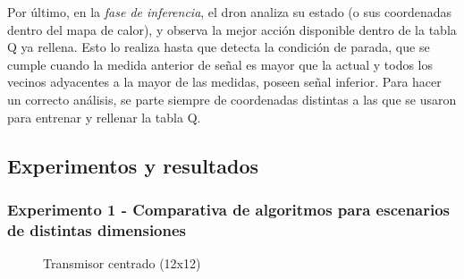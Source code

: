 Por último, en la \emph{fase de inferencia}, el dron analiza su estado (o sus coordenadas dentro del mapa de calor), y observa la mejor acción disponible dentro de la tabla Q ya rellena. Esto lo realiza hasta que detecta la condición de parada, que se cumple cuando la medida anterior de señal es mayor que la actual y todos los vecinos adyacentes a la mayor de las medidas, poseen señal inferior. Para hacer un correcto análisis, se parte siempre de coordenadas distintas a las que se usaron para entrenar y rellenar la tabla Q.

\subsection{Experimentos y resultados}
\label{subsec:experimentos_sf}

\subsubsection{Experimento 1 - Comparativa de algoritmos para escenarios de distintas dimensiones}
\label{subsubsec:experimentos_1}

\begin{figure} [tp]
	\centering
	\quad
	\caption{Transmisor centrado (12x12)}
	\label{fig:map_p_center_12}
\end{figure}

